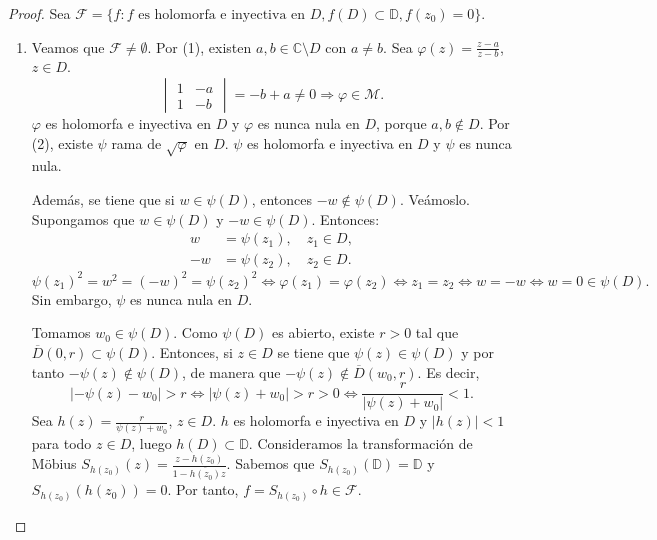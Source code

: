 \begin{proof}
    Sea $\mathcal{F} = \{f : f \text{ es holomorfa e inyectiva en } D, f(D) \subset \mathbb{D}, f(z_0) = 0\}$.
    \begin{enumerate}
        \item Veamos que $\mathcal{F} \neq \emptyset$.
              Por (1), existen $a, b \in \mathbb{C} \setminus D$ con $a \neq b$.
              Sea $\varphi(z) = \frac{z-a}{z-b}$, $z \in D$.
              $$\begin{vmatrix}
                      1 & -a \\
                      1 & -b
                  \end{vmatrix} = -b + a \neq 0 \Rightarrow \varphi \in \mathcal{M}.$$
              $\varphi$ es holomorfa e inyectiva en $D$ y $\varphi$ es nunca nula en $D$, porque $a, b \notin D$.
              Por (2), existe $\psi$ rama de $\sqrt{\varphi}$ en $D$.
              $\psi$ es holomorfa e inyectiva en $D$ y $\psi$ es nunca nula.

              Además, se tiene que si $w \in \psi(D)$, entonces $-w \notin \psi(D)$.
              Veámoslo.
              Supongamos que $w \in \psi(D)$ y $-w \in \psi(D)$.
              Entonces:
              \begin{align*}
                  w  & = \psi(z_1), \quad z_1 \in D, \\
                  -w & = \psi(z_2), \quad z_2 \in D.
              \end{align*}
              $$\psi(z_1)^2 = w^2 = (-w)^2 = \psi(z_2)^2 \Leftrightarrow \varphi(z_1) = \varphi(z_2) \Leftrightarrow z_1 = z_2 \Leftrightarrow w = -w \Leftrightarrow w = 0 \in \psi(D).$$
              Sin embargo, $\psi$ es nunca nula en $D$.

              Tomamos $w_0 \in \psi(D)$.
              Como $\psi(D)$ es abierto, existe $r > 0$ tal que $\overline{D}(0, r) \subset \psi(D)$.
              Entonces, si $z \in D$ se tiene que $\psi(z) \in \psi(D)$ y por tanto $-\psi(z) \notin \psi(D)$, de manera que $-\psi(z) \notin \overline{D}(w_0, r)$.
              Es decir,
              $$|-\psi(z)-w_0| > r \Leftrightarrow |\psi(z)+w_0| > r > 0 \Leftrightarrow \frac{r}{|\psi(z)+w_0|} < 1.$$
              Sea $h(z) = \frac{r}{\psi(z)+w_0}$, $z \in D$.
              $h$ es holomorfa e inyectiva en $D$ y $|h(z)| < 1$ para todo $z \in D$, luego $h(D) \subset \mathbb{D}$.
              Consideramos la transformación de Möbius $S_{h(z_0)}(z) = \frac{z-h(z_0)}{1-\overline{h(z_0)}z}$.
              Sabemos que $S_{h(z_0)}(\mathbb{D}) = \mathbb{D}$ y $S_{h(z_0)}(h(z_0)) = 0$.
              Por tanto, $f = S_{h(z_0)} \circ h \in \mathcal{F}$.


\end{enumerate}
\end{proof}
